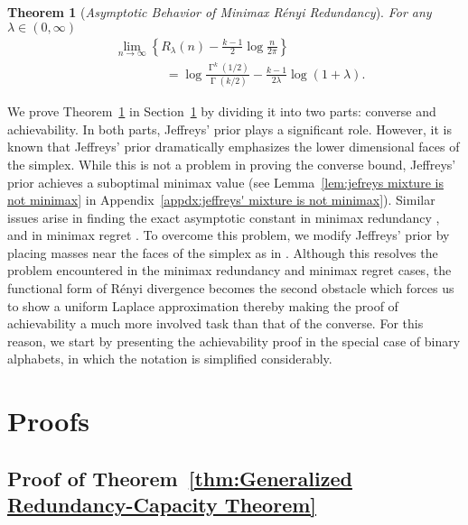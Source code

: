\documentclass[journal, 10pt]{IEEEtran}
\theoremstyle{plain}
\newtheorem{thm}{Theorem}%
\theoremstyle{plain}
\theoremstyle{plain}
\theoremstyle{plain}
\newcommand{\opGamma}{\operatorname{\Gamma}}
\begin{document}
\begin{thm}[\textit{\textsf{\small Asymptotic Behavior of Minimax R\'enyi Redundancy}}] \label{thm:Asymptotic Behavior of Minimax Renyi Redundancy} For any $\lambda \in (0, \infty) $
\begin{align}
	&\lim_{n\to \infty} \left\{ 	R_\lambda (n)-\frac{k-1}{2}\log \frac{n}{2\pi} \right\} \nonumber \\
	&\qquad \qquad =\log \frac{\opGamma^k(1/2)}{\opGamma(k/2)}-\frac{k-1}{2\lambda}\log(1+\lambda) \text{.} \label{eqn:thm:asymp-minmax-renyi-red}
\end{align}		
\end{thm}
We prove Theorem~\ref{thm:Asymptotic Behavior of Minimax Renyi Redundancy} in Section~\ref{sec:proofs} by dividing it into two parts: converse and achievability. In both parts, Jeffreys' prior plays a significant role. However, it is known that Jeffreys' prior dramatically emphasizes the lower dimensional faces of the simplex. While this is not a problem in proving the converse bound, Jeffreys' prior achieves a suboptimal minimax value (see Lemma~\ref{lem:jefreys mixture is not minimax} in Appendix~\ref{appdx:jeffreys' mixture is not minimax}). Similar issues arise in finding the exact asymptotic constant in minimax redundancy \cite{XieBarron1997}, and in minimax regret \cite{XieBarron2000}. To overcome this problem, we modify Jeffreys' prior by placing masses near the faces of the simplex as in \cite{XieBarron1997}. Although this resolves the problem encountered in the minimax redundancy and minimax regret cases, the functional form of R\'enyi divergence becomes the second obstacle which forces us to show a uniform Laplace approximation thereby making the proof of achievability a much more involved task than that of the converse. For this reason, we start by presenting the achievability proof in the special case of binary alphabets, in which the notation is simplified considerably.

\section{Proofs } \label{sec:proofs}
\subsection{Proof of Theorem~\ref{thm:Generalized Redundancy-Capacity Theorem}}
\end{document}
